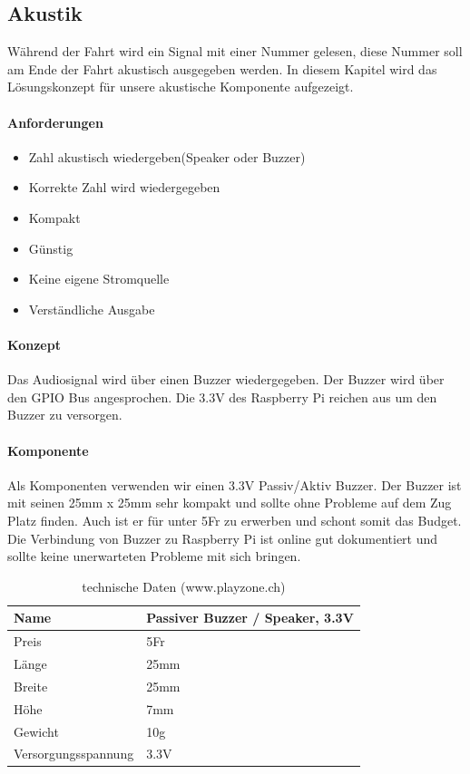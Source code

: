 \documentclass[../../main.tex]{subfiles}
\begin{document}
\subsection{Akustik}
Während der Fahrt wird ein Signal mit einer Nummer gelesen, diese Nummer soll am Ende der Fahrt akustisch ausgegeben werden. In diesem Kapitel wird das Lösungskonzept für unsere akustische Komponente aufgezeigt.

\paragraph{Anforderungen}
\begin{itemize}
    \item Zahl akustisch wiedergeben(Speaker oder Buzzer)
    \item Korrekte Zahl wird wiedergegeben
    \item Kompakt
    \item Günstig
    \item Keine eigene Stromquelle
    \item Verständliche Ausgabe
\end{itemize}

\paragraph{Konzept}
Das Audiosignal wird über einen Buzzer wiedergegeben. Der Buzzer wird über den GPIO Bus angesprochen. Die 3.3V des Raspberry Pi reichen aus um den Buzzer zu versorgen.

\paragraph{Komponente}
Als Komponenten verwenden wir einen 3.3V Passiv/Aktiv Buzzer. Der Buzzer ist mit seinen 25mm x 25mm sehr kompakt und sollte ohne Probleme auf dem Zug Platz finden. Auch ist er für unter 5Fr zu erwerben und schont somit das Budget. Die Verbindung von Buzzer zu Raspberry Pi ist online gut dokumentiert und sollte keine unerwarteten Probleme mit sich bringen.

\begin{table}[H]
\begin{center}
\begin{tabular}{ll}
Name & Passiver Buzzer / Speaker, 3.3V \\ \hline
Preis & 5Fr     \\ \hline
Länge & 25mm    \\ \hline
Breite & 25mm   \\ \hline
Höhe & 7mm      \\ \hline
Gewicht & 10g   \\ \hline
Versorgungsspannung & 3.3V \\ \hline
\end{tabular}
\caption{technische Daten (www.playzone.ch)}
\end{center}
\end{table}
\end{document}
